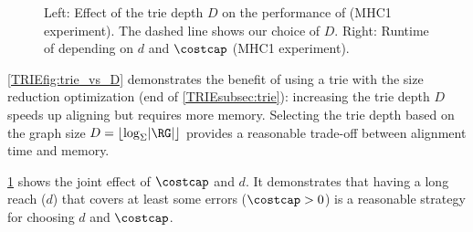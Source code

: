 \begin{figure}[H]
\begin{minipage}{0.45\linewidth}
		\label{TRIEfig:heuristic-parameters}
	\end{minipage}
	\caption[Performance for various trie depths and heuristic parameters]{Left: Effect of the trie depth $D$ on the performance of \astarix (MHC1 experiment). The dashed line shows our choice of $D$. Right: Runtime of \astarix depending on $d$ and $\costcap$ (MHC1 experiment).}
\end{figure}

\cref{TRIEfig:trie_vs_D} demonstrates the benefit of using a trie with the size
reduction optimization (end of \cref{TRIEsubsec:trie}): increasing the trie depth
$D$ speeds up aligning but requires more memory. Selecting the trie depth based
on the graph size \mbox{$D = \lfloor \log_\Sigma \lvert \RG \rvert \rfloor$}
provides a reasonable trade-off between alignment time and memory.

\cref{TRIEfig:heuristic-parameters} shows the joint effect of $\costcap$ and $d$. It
demonstrates that having a long reach ($d$) that covers at least some errors
($\costcap > 0$) is a reasonable strategy for choosing $d$ and $\costcap$.
